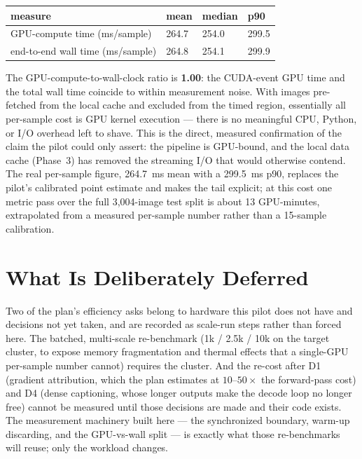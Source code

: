 \begin{center}
\begin{tabular}{p{5.2cm}p{2.2cm}p{2.2cm}p{2.2cm}}
\toprule
\textbf{measure} & \textbf{mean} & \textbf{median} & \textbf{p90} \\
\midrule
GPU-compute time (ms/sample)    & 264.7 & 254.0 & 299.5 \\
end-to-end wall time (ms/sample) & 264.8 & 254.1 & 299.9 \\
\bottomrule
\end{tabular}
\label{tab:p26-timing}
\end{center}

The GPU-compute-to-wall-clock ratio is \textbf{1.00}: the CUDA-event GPU time and the total wall time
coincide to within measurement noise. With images pre-fetched from the local cache and excluded from the
timed region, essentially all per-sample cost is GPU kernel execution --- there is no meaningful
CPU, Python, or I/O overhead left to shave. This is the direct, measured confirmation of the claim the
pilot could only assert: the pipeline is GPU-bound, and the local data cache (Phase~3) has removed the
streaming I/O that would otherwise contend. The real per-sample figure, 264.7~ms mean with a 299.5~ms
p90, replaces the pilot's calibrated point estimate and makes the tail explicit; at this cost one metric
pass over the full 3{,}004-image test split is about 13 GPU-minutes, extrapolated from a measured
per-sample number rather than a 15-sample calibration.

\section{What Is Deliberately Deferred}

Two of the plan's efficiency asks belong to hardware this pilot does not have and decisions not yet
taken, and are recorded as scale-run steps rather than forced here. The batched, multi-scale re-benchmark
(1k / 2.5k / 10k on the target cluster, to expose memory fragmentation and thermal effects that a
single-GPU per-sample number cannot) requires the cluster. And the re-cost after D1 (gradient attribution,
which the plan estimates at $10$--$50\times$ the forward-pass cost) and D4 (dense captioning, whose longer
outputs make the decode loop no longer free) cannot be measured until those decisions are made and their
code exists. The measurement machinery built here --- the synchronized boundary, warm-up discarding, and
the GPU-vs-wall split --- is exactly what those re-benchmarks will reuse; only the workload changes.

